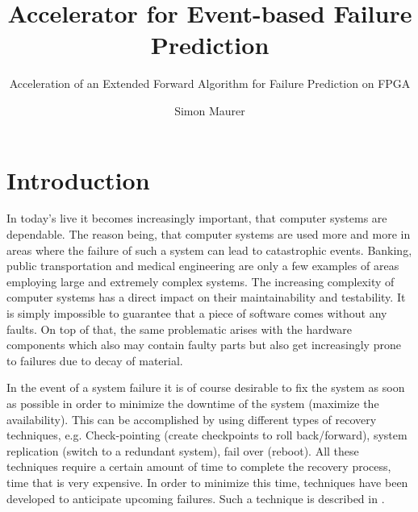 \documentclass[mscthesis]{usiinfthesis}
\title{Accelerator for Event-based Failure Prediction} %
\subtitle{Acceleration of an Extended Forward Algorithm for Failure Prediction
    on FPGA}
\author{Simon Maurer} %
\begin{document}
\maketitle %

\frontmatter %

\begin{abstract}
\end{abstract}

%

\begin{acknowledgements}
\end{acknowledgements}

\tableofcontents 
\listoffigures %
\listoftables %

\mainmatter

\chapter{Introduction}
\label{ch:intro}
In today's live it becomes increasingly important, that computer systems are
dependable. The reason being, that computer systems are used more and more in
areas where the failure of such a system can lead to catastrophic events.
Banking, public transportation and medical engineering are only a few examples
of areas employing large and extremely complex systems. The increasing
complexity of computer systems has a direct impact on their maintainability and
testability. It is simply impossible to guarantee that a piece of software comes
without any faults. On top of that, the same problematic arises with the
hardware components which also may contain faulty parts but also get
increasingly prone to failures due to decay of material.

In the event of a system failure it is of course desirable to fix the system as
soon as possible in order to minimize the downtime of the system (maximize the
availability). This can be accomplished by using different types of recovery
techniques, e.g. Check-pointing (create checkpoints to roll back/forward),
system replication (switch to a redundant system), fail over (reboot). All these
techniques require a certain amount of time to complete the recovery process,
time that is very expensive. In order to minimize this time, techniques have
been developed to anticipate upcoming failures. Such a technique is described in
\cite{salfner08}.
\end{document}
